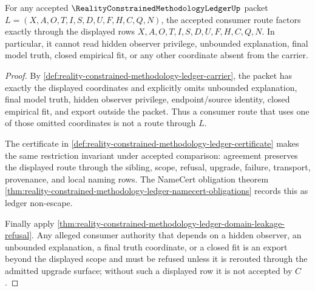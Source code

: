 \begin{theorem}
\label{thm:reality-constrained-methodology-ledger-consumer-route-exactness}
For any accepted $\RealityConstrainedMethodologyLedgerUp$ packet $L=(X,A,O,T,I,S,D,U,F,H,C,Q,N)$, the accepted consumer route factors exactly through the displayed rows $X,A,O,T,I,S,D,U,F,H,C,Q,N$. In particular, it cannot read hidden observer privilege, unbounded explanation, final model truth, closed empirical fit, or any other coordinate absent from the carrier.
\end{theorem}
\begin{proof}
By \autoref{def:reality-constrained-methodology-ledger-carrier}, the packet has exactly the displayed coordinates and explicitly omits unbounded explanation, final model truth, hidden observer privilege, endpoint/source identity, closed empirical fit, and export outside the packet. Thus a consumer route that uses one of those omitted coordinates is not a route through $L$.

The certificate in \autoref{def:reality-constrained-methodology-ledger-certificate} makes the same restriction invariant under accepted comparison: agreement preserves the displayed route through the sibling, scope, refusal, upgrade, failure, transport, provenance, and local naming rows. The NameCert obligation theorem \autoref{thm:reality-constrained-methodology-ledger-namecert-obligations} records this as ledger non-escape.

Finally apply \autoref{thm:reality-constrained-methodology-ledger-domain-leakage-refusal}. Any alleged consumer authority that depends on a hidden observer, an unbounded explanation, a final truth coordinate, or a closed fit is an export beyond the displayed scope and must be refused unless it is rerouted through the admitted upgrade surface; without such a displayed row it is not accepted by $C$.
\end{proof}

